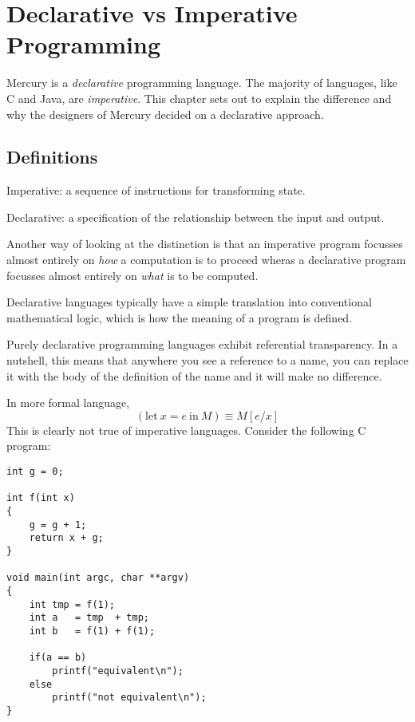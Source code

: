 
\chapter{Declarative vs Imperative Programming}

Mercury is a \emph{declarative} programming language.  The majority of
languages, like C and Java, are \emph{imperative}.  This chapter sets
out to explain the difference and why the designers of Mercury decided
on a declarative approach.







\section{Definitions}

\begin{description}
\item{Imperative:} a sequence of instructions for transforming state.
\item{Declarative:} a specification of the relationship between the
input and output.
\end{description}
Another way of looking at the distinction is that an imperative program
focusses almost entirely on \emph{how} a computation is to proceed
wheras a declarative program focusses almost entirely on \emph{what} is
to be computed.

Declarative languages typically have a simple translation into
conventional mathematical logic, which is how the meaning of a program
is defined.

Purely declarative programming languages exhibit referential
transparency.  In a nutshell, this means that anywhere you see a
reference to a name, you can replace it with the body of the
definition of the name and it will make no difference.

In more formal language,
\[
(\text{let}\ x = e\ \text{in}\ M)  \equiv  M[e/x]
\]
This is clearly not true of imperative languages.  Consider
the following C program:

\begin{verbatim}
int g = 0;

int f(int x)
{
    g = g + 1;
    return x + g;
}

void main(int argc, char **argv)
{
    int tmp = f(1);
    int a   = tmp  + tmp;
    int b   = f(1) + f(1);

    if(a == b)
        printf("equivalent\n");
    else
        printf("not equivalent\n");
}
\end{verbatim}

